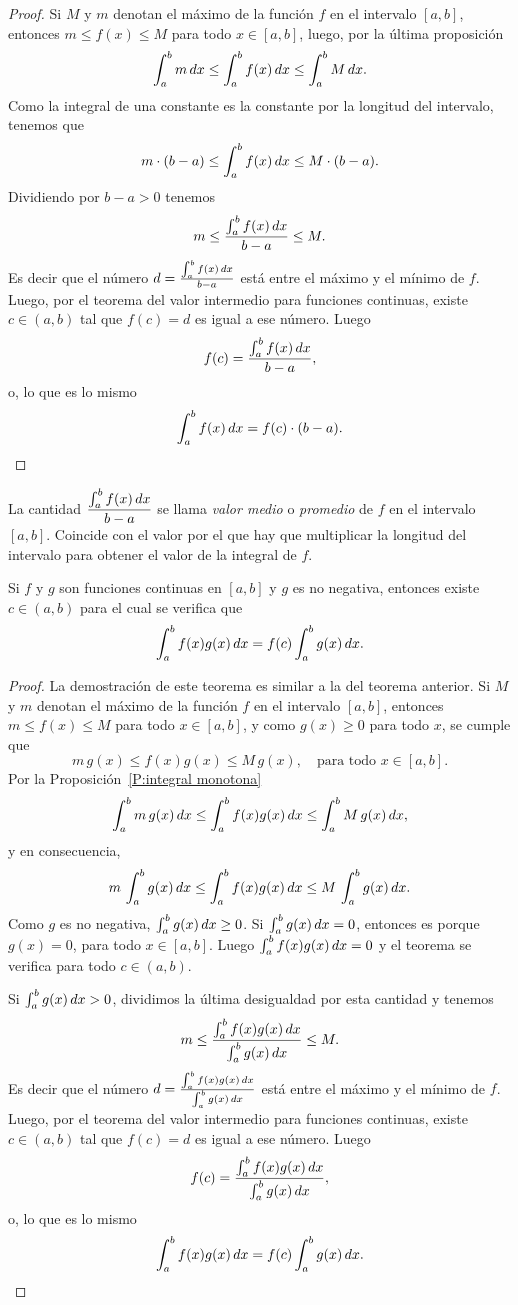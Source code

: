 \begin{proof}
  Si $M$ y $m$ denotan el máximo de la función $f$ en el intervalo $[a,b]$, entonces $m\le f(x)\le M$ para todo $x\in[a,b]$, luego, por la última proposición
  \[
  \int_a^b m\,dx
  \le \int_a^b f(x)\,dx
  \le \int_a^b M\,dx.
  \]
  Como la integral de una constante es la constante por la longitud del intervalo, tenemos que
  \[
    m\cdot(b-a)
    \le \int_a^b f(x)\,dx
    \le M\cdot(b-a).
  \]
  Dividiendo por $b-a>0$ tenemos
  \[
  m \le \frac{\int_a^b f(x)\,dx}{b-a}\le M.
  \]
  Es decir que el número $d=\frac{\int_a^b f(x)\,dx}{b-a}$ está entre el máximo y el mínimo de $f$. Luego, por el teorema del valor intermedio para funciones continuas, existe $c\in(a,b)$ tal que $f(c)=d$ es igual a ese número. Luego
  \[
  f(c) = \frac{\int_a^b f(x)\,dx}{b-a},
  \]
  o, lo que es lo mismo
  \[
  \int_a^b f(x)\,dx = f(c)\cdot(b-a).
  \qedhere
  \]
\end{proof}

\begin{remark}
  La cantidad $\displaystyle \frac{\int_a^b f(x)\,dx}{b-a}$ se llama \emph{valor medio} o \emph{promedio} de $f$ en el intervalo $[a,b]$. Coincide con el valor por el que hay que multiplicar la longitud del intervalo para obtener el valor de la integral de $f$.
\end{remark}

\begin{theorem}\label{T:TVM-integral-generalizado}
Si $f$ y $g$ son funciones continuas en $[a,b]$ y $g$ es no negativa, entonces existe $c\in(a,b)$ para el cual se verifica que
\[
\int_a^b f(x)g(x)\,dx = f(c) \int_a^b g(x)\,dx.
\] 
\end{theorem}

\begin{proof}
  La demostración de este teorema es similar a la del teorema anterior. 
  Si $M$ y $m$ denotan el máximo de la función $f$ en el intervalo $[a,b]$, entonces $m\le f(x)\le M$ para todo $x\in[a,b]$, y como $g(x)\ge 0$ para todo $x$, se cumple que
  \[
  m\,g(x)\le f(x)g(x)\le M\,g(x), \quad\text{para todo $x\in[a,b]$.}
  \]
  Por la Proposición~\ref{P:integral monotona}
  \[
  \int_a^b m\,g(x)\,dx
  \le \int_a^b f(x)g(x)\,dx
  \le \int_a^b M\,g(x)\,dx,
  \]
  y en consecuencia,
  \[
    m\,\int_a^b g(x)\,dx
  \le \int_a^b f(x)g(x)\,dx
  \le M\,\int_a^b g(x)\,dx.
  \]
  Como $g$ es no negativa, $\int_a^b g(x)\,dx\ge 0$. 
  Si $\int_a^b g(x)\,dx=0$, entonces es porque $g(x)=0$, para todo $x\in[a,b]$.
  Luego $\int_a^b f(x)g(x)\,dx=0$ y el teorema se verifica para todo $c\in(a,b)$.
  
  Si $\int_a^b g(x)\,dx > 0$, dividimos la última desigualdad por esta cantidad y tenemos
  \[
    m
    \le \frac{\int_a^b f(x)g(x)\,dx}{\int_a^b g(x)\,dx}
    \le M.
  \]
  Es decir que el número $d=\frac{\int_a^b f(x)g(x)\,dx}{\int_a^b g(x)\,dx}$ está entre el máximo y el mínimo de $f$. Luego, por el teorema del valor intermedio para funciones continuas, existe $c\in(a,b)$ tal que $f(c)=d$ es igual a ese número. Luego
  \[
  f(c) = \frac{\int_a^b f(x)g(x)\,dx}{\int_a^b g(x)\,dx},
  \]
  o, lo que es lo mismo
  \[
  \int_a^b f(x)g(x)\,dx = f(c)\int_a^b g(x)\,dx.
  \qedhere
  \]
\end{proof}

